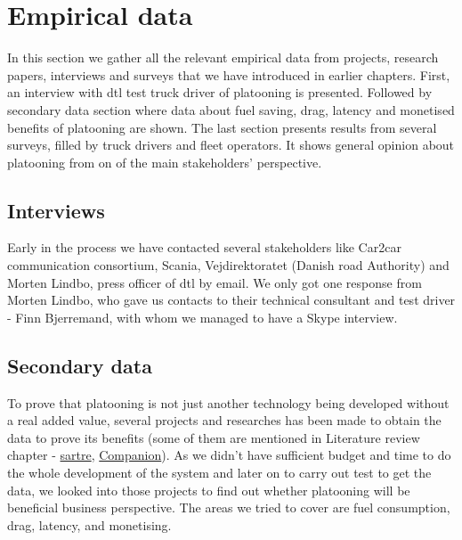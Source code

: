 \section{Empirical data}\label{sec:data}
% 
In this section we gather all the relevant empirical data from projects, research papers, interviews and surveys that we have introduced in earlier chapters. First, an interview with \acrfull{dtl} test truck driver of platooning is presented. Followed by secondary data section where data about fuel saving, drag, latency and monetised benefits of platooning are shown. The last section presents results from several surveys, filled  by truck drivers and fleet operators. It shows general opinion about platooning from on of the main stakeholders' perspective.
% 
\subsection{Interviews}
% 
Early in the process we have contacted several stakeholders like Car2car communication consortium, Scania, Vejdirektoratet (Danish road Authority) and Morten Lindbo, press officer of \acrshort{dtl} by email. We only got one response from Morten Lindbo, who gave us contacts to their technical consultant and test driver - Finn Bjerremand, with whom we managed to have a Skype interview.
% 

% 
\subsection{Secondary data}
% 
To prove that platooning is not just another technology being developed without a real added value, several projects and researches has been made to obtain the data to prove its benefits (some of them are mentioned in Literature review chapter - \hyperref[sec:SARTRE]{\acrshort{sartre}}, \hyperref[sec:Companion]{Companion}). As we didn't have sufficient budget and time to do the whole development of the system and later on to carry out test to get the data, we looked into those projects to find out whether platooning will be beneficial business perspective. The areas we tried to cover are fuel consumption, drag, latency, and monetising.
% 

% 

% 

% 

% 
